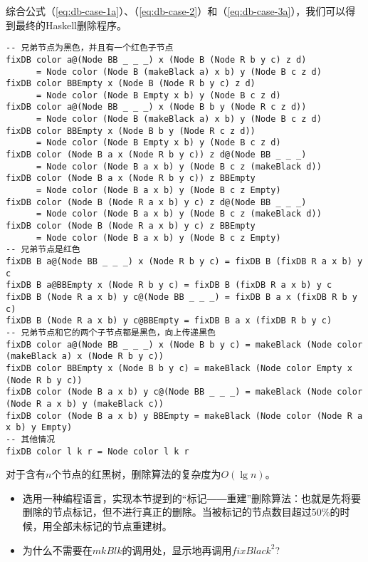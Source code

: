 \documentclass[UTF8]{article}
\begin{document}
综合公式（\ref{eq:db-case-1a}）、（\ref{eq:db-case-2}）和（\ref{eq:db-case-3a}），我们可以得到最终的Haskell删除程序。

\begin{lstlisting}[style=Haskell]
-- 兄弟节点为黑色，并且有一个红色子节点
fixDB color a@(Node BB _ _ _) x (Node B (Node R b y c) z d)
      = Node color (Node B (makeBlack a) x b) y (Node B c z d)
fixDB color BBEmpty x (Node B (Node R b y c) z d)
      = Node color (Node B Empty x b) y (Node B c z d)
fixDB color a@(Node BB _ _ _) x (Node B b y (Node R c z d))
      = Node color (Node B (makeBlack a) x b) y (Node B c z d)
fixDB color BBEmpty x (Node B b y (Node R c z d))
      = Node color (Node B Empty x b) y (Node B c z d)
fixDB color (Node B a x (Node R b y c)) z d@(Node BB _ _ _)
      = Node color (Node B a x b) y (Node B c z (makeBlack d))
fixDB color (Node B a x (Node R b y c)) z BBEmpty
      = Node color (Node B a x b) y (Node B c z Empty)
fixDB color (Node B (Node R a x b) y c) z d@(Node BB _ _ _)
      = Node color (Node B a x b) y (Node B c z (makeBlack d))
fixDB color (Node B (Node R a x b) y c) z BBEmpty
      = Node color (Node B a x b) y (Node B c z Empty)
-- 兄弟节点是红色
fixDB B a@(Node BB _ _ _) x (Node R b y c) = fixDB B (fixDB R a x b) y c
fixDB B a@BBEmpty x (Node R b y c) = fixDB B (fixDB R a x b) y c
fixDB B (Node R a x b) y c@(Node BB _ _ _) = fixDB B a x (fixDB R b y c)
fixDB B (Node R a x b) y c@BBEmpty = fixDB B a x (fixDB R b y c)
-- 兄弟节点和它的两个子节点都是黑色，向上传递黑色
fixDB color a@(Node BB _ _ _) x (Node B b y c) = makeBlack (Node color (makeBlack a) x (Node R b y c))
fixDB color BBEmpty x (Node B b y c) = makeBlack (Node color Empty x (Node R b y c))
fixDB color (Node B a x b) y c@(Node BB _ _ _) = makeBlack (Node color (Node R a x b) y (makeBlack c))
fixDB color (Node B a x b) y BBEmpty = makeBlack (Node color (Node R a x b) y Empty)
-- 其他情况
fixDB color l k r = Node color l k r
\end{lstlisting}

对于含有$n$个节点的红黑树，删除算法的复杂度为$O(\lg n)$。

\begin{Exercise}

\begin{itemize}
\item 选用一种编程语言，实现本节提到的“标记――重建”删除算法：也就是先将要删除的节点标记，但不进行真正的删除。当被标记的节点数目超过50\%的时候，用全部未标记的节点重建树。
\item 为什么不需要在$mkBlk$的调用处，显示地再调用$fixBlack^2$?
\end{itemize}

\end{Exercise}
\end{document}
